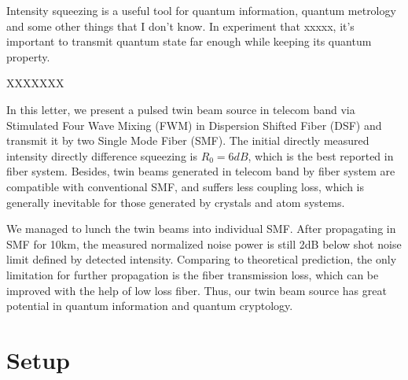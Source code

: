 \documentclass[9pt,twocolumn,twoside]{osajnl}
\begin{document}
Intensity squeezing is a useful tool for quantum information, quantum metrology and some other things that I don't know. In experiment that xxxxx, it's important to transmit quantum state far enough while keeping its quantum property.

XXXXXXX

In this letter, we present a pulsed twin beam source in telecom band via Stimulated Four Wave Mixing (FWM) in Dispersion Shifted Fiber (DSF) and transmit it by two Single Mode Fiber (SMF). The initial directly measured intensity directly difference squeezing is $R_{0}= 6 dB$, which is the best reported in fiber system. Besides, twin beams generated in telecom band by fiber system are compatible with conventional SMF, and suffers less coupling loss, which is generally inevitable for those generated by crystals and atom systems.%

We managed to lunch the twin beams into individual SMF.
After propagating in SMF for 10km, the measured normalized noise power is still 2dB below shot noise limit defined by detected intensity. Comparing to theoretical prediction, the only limitation for further propagation is the fiber transmission loss, which can be improved with the help of low loss fiber. Thus, our twin beam source has great potential in quantum information and quantum cryptology.


\section{Setup}
\end{document}
